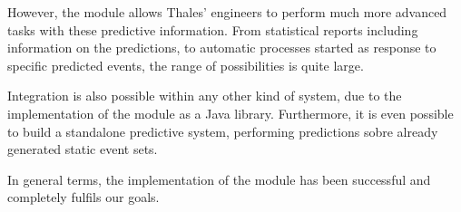 However, the module allows Thales' engineers to perform much more advanced tasks with these predictive information. From statistical reports including information on the predictions, to automatic processes started as response to specific predicted events, the range of possibilities is quite large.

Integration is also possible within any other kind of system, due to the implementation of the module as a Java library. Furthermore, it is even possible to build a standalone predictive system, performing predictions sobre already generated static event sets.

In general terms, the implementation of the module has been successful and completely fulfils our goals.

\clearpage

